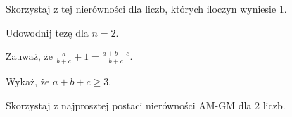 
\begin{hints_list}
	\item Skorzystaj z tej nierówności dla liczb, których iloczyn wyniesie 1.
	\item Udowodnij tezę dla $n = 2$.
	\item Zauważ, że $\frac{a}{b + c} + 1 = \frac{a + b + c}{b + c}$.
	\item Wykaż, że $a + b + c \geqslant 3$.
	\item Skorzystaj z najprosztej postaci nierówności AM-GM dla 2 liczb.
\end{hints_list}